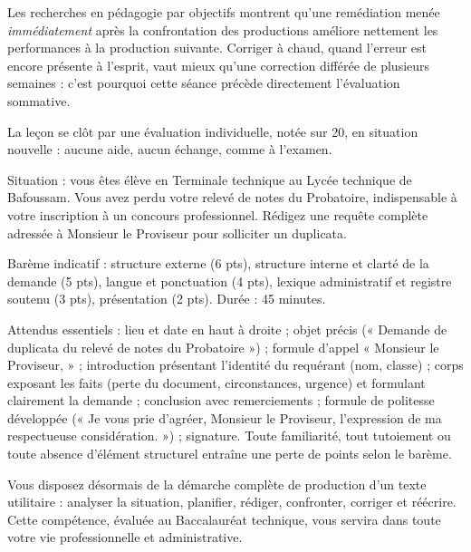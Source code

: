 \documentclass[11pt]{article}
\newcounter{popsec}
\newcounter{popsub}
\newcommand{\courssub}[1]{%
  \stepcounter{popsub}%
  \par\vspace{9pt}\noindent{\popxbold\fontsize{11.5}{13}\selectfont\color{popink}{\color{poporange}\thepopsec.\thepopsub}\hspace{6pt}#1}\par\nopagebreak\vspace{4pt}
}
\begin{document}
\begin{savaistu}
Les recherches en pédagogie par objectifs montrent qu'une remédiation menée \emph{immédiatement} après la confrontation des productions améliore nettement les performances à la production suivante. Corriger à chaud, quand l'erreur est encore présente à l'esprit, vaut mieux qu'une correction différée de plusieurs semaines : c'est pourquoi cette séance précède directement l'évaluation sommative.
\end{savaistu}

\courssub{Évaluation sommative}

La leçon se clôt par une évaluation individuelle, notée sur 20, en situation nouvelle : aucune aide, aucun échange, comme à l'examen.

\begin{exercice}
Situation : vous êtes élève en Terminale technique au Lycée technique de Bafoussam. Vous avez perdu votre relevé de notes du Probatoire, indispensable à votre inscription à un concours professionnel. Rédigez une requête complète adressée à Monsieur le Proviseur pour solliciter un duplicata.

Barème indicatif : structure externe (6 pts), structure interne et clarté de la demande (5 pts), langue et ponctuation (4 pts), lexique administratif et registre soutenu (3 pts), présentation (2 pts). Durée : 45 minutes.
\end{exercice}

\begin{corrige}
Attendus essentiels : lieu et date en haut à droite ; objet précis (« Demande de duplicata du relevé de notes du Probatoire ») ; formule d'appel « Monsieur le Proviseur, » ; introduction présentant l'identité du requérant (nom, classe) ; corps exposant les faits (perte du document, circonstances, urgence) et formulant clairement la demande ; conclusion avec remerciements ; formule de politesse développée (« Je vous prie d'agréer, Monsieur le Proviseur, l'expression de ma respectueuse considération. ») ; signature. Toute familiarité, tout tutoiement ou toute absence d'élément structurel entraîne une perte de points selon le barème.
\end{corrige}

Vous disposez désormais de la démarche complète de production d'un texte utilitaire : analyser la situation, planifier, rédiger, confronter, corriger et réécrire. Cette compétence, évaluée au Baccalauréat technique, vous servira dans toute votre vie professionnelle et administrative.
\end{document}
